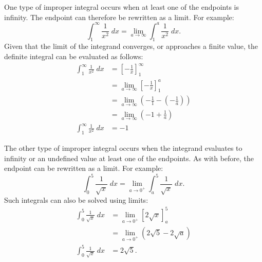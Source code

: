 One type of improper integral occurs when at least one of the endpoints is infinity. The endpoint can therefore be rewritten as a limit. For example:
\[ \int_1^\infty \frac{1}{x^2} \; dx = \lim_{a \to \infty} \int_1^a \frac{1}{x^2} \; dx. \]
Given that the limit of the integrand converges, or approaches a finite value, the definite integral can be evaluated as follows:
\begin{align*}
	\int_1^\infty \frac{1}{x^2} \; dx &= \left[ -\frac{1}{x} \right]_1^\infty \\[5pt]
	&= \lim_{a \to \infty} \left[ -\frac{1}{x} \right]_1^a \\[5pt]
	&= \lim_{a \to \infty} \left( -\frac{1}{1} - \left( -\frac{1}{a} \right) \right) \\[5pt]
	&= \lim_{a \to \infty} \left( -1 + \frac{1}{a} \right) \\[5pt]
	\int_1^\infty \frac{1}{x^2} \; dx &= -1
\end{align*}

The other type of improper integral occurs when the integrand evaluates to infinity or an undefined value at least one of the endpoints. As with before, the endpoint can be rewritten as a limit. For example:
\[ \int_0^5 \frac{1}{\sqrt{x}} \; dx = \lim_{a \to 0^+} \int_a^5 \frac{1}{\sqrt{x}} \; dx. \]
Such integrals can also be solved using limits:
\begin{align*}
	\int_0^5 \frac{1}{\sqrt{x}} \; dx &= \lim_{a \to 0^+} [2 \sqrt{x}]_a^5 \\[5pt]
	&= \lim_{a \to 0^+} (2 \sqrt{5} - 2 \sqrt{a}) \\
	\int_0^5 \frac{1}{\sqrt{x}} \; dx &= 2 \sqrt{5}.
\end{align*}
